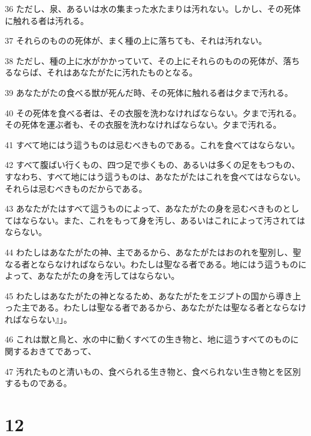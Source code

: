\par 36 ただし、泉、あるいは水の集まった水たまりは汚れない。しかし、その死体に触れる者は汚れる。
\par 37 それらのものの死体が、まく種の上に落ちても、それは汚れない。
\par 38 ただし、種の上に水がかかっていて、その上にそれらのものの死体が、落ちるならば、それはあなたがたに汚れたものとなる。
\par 39 あなたがたの食べる獣が死んだ時、その死体に触れる者は夕まで汚れる。
\par 40 その死体を食べる者は、その衣服を洗わなければならない。夕まで汚れる。その死体を運ぶ者も、その衣服を洗わなければならない。夕まで汚れる。
\par 41 すべて地にはう這うものは忌むべきものである。これを食べてはならない。
\par 42 すべて腹ばい行くもの、四つ足で歩くもの、あるいは多くの足をもつもの、すなわち、すべて地にはう這うものは、あなたがたはこれを食べてはならない。それらは忌むべきものだからである。
\par 43 あなたがたはすべて這うものによって、あなたがたの身を忌むべきものとしてはならない。また、これをもって身を汚し、あるいはこれによって汚されてはならない。
\par 44 わたしはあなたがたの神、主であるから、あなたがたはおのれを聖別し、聖なる者とならなければならない。わたしは聖なる者である。地にはう這うものによって、あなたがたの身を汚してはならない。
\par 45 わたしはあなたがたの神となるため、あなたがたをエジプトの国から導き上った主である。わたしは聖なる者であるから、あなたがたは聖なる者とならなければならない』」。
\par 46 これは獣と鳥と、水の中に動くすべての生き物と、地に這うすべてのものに関するおきてであって、
\par 47 汚れたものと清いもの、食べられる生き物と、食べられない生き物とを区別するものである。

\chapter{12}

